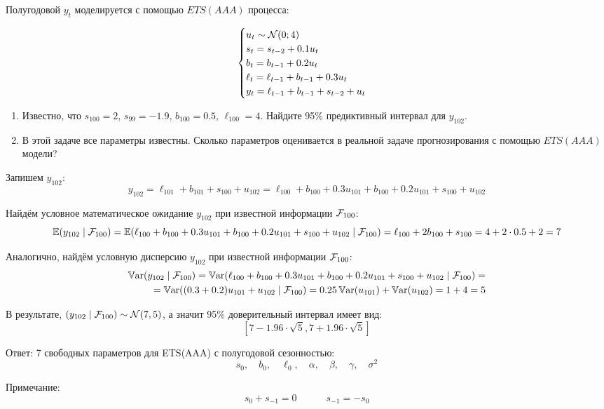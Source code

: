 \begin{problem}
Полугодовой $y_t$ моделируется с помощью $ETS(AAA)$ процесса:
    
\[
\begin{cases}
    u_t \sim \mathcal{N}(0; 4) \\
    s_t = s_{t-2} + 0.1 u_t \\
    b_t = b_{t-1} + 0.2 u_t \\
    \ell_t = \ell_{t-1} + b_{t-1} + 0.3 u_t \\
    y_t = \ell_{t-1} + b_{t-1} + s_{t-2} + u_t \\
\end{cases}    
\]

\begin{enumerate}
    \item Известно, что $s_{100} = 2$, $s_{99} = -1.9$, $b_{100} = 0.5$, $\ell_{100} = 4$. Найдите 95\% предиктивный интервал для $y_{102}$. 
    \item В этой задаче все параметры известны. Сколько параметров оценивается в реальной задаче прогнозирования с помощью $ETS(AAA)$ модели?
\end{enumerate}
\begin{sol}

  Запишем $y_{102}$:
  \[
  y_{102} = \ell_{101} + b_{101} + s_{100} + u_{102} = \ell_{100} + b_{100} + 0.3 u_{101} + b_{100} + 0.2 u_{101} + s_{100} + u_{102}
  \]

  Найдём условное математическое ожидание $y_{102}$ при известной информации $\mathcal{F}_{100}$:
  \[
  \operatorname{\mathbb{E}}(y_{102}\mid \mathcal{F}_{100}) = \operatorname{\mathbb{E}}(\ell_{100} + b_{100} + 0.3 u_{101} + b_{100} + 0.2 u_{101} + s_{100} + u_{102}\mid \mathcal{F}_{100}) = \ell_{100} + 2 b_{100} + s_{100} = 4 + 2 \cdot 0.5 + 2 = 7
  \]

  Аналогично, найдём условную дисперсию $y_{102}$ при известной информации $\mathcal{F}_{100}$:
  \begin{align*}  
  \operatorname{\mathbb{V}\mathrm{ar}}(y_{102}\mid \mathcal{F}_{100}) = \operatorname{\mathbb{V}\mathrm{ar}}(\ell_{100} + b_{100} + 0.3 u_{101} + b_{100} + 0.2 u_{101} + s_{100} + u_{102}\mid \mathcal{F}_{100}) = &\\
  = \operatorname{\mathbb{V}\mathrm{ar}}((0.3+0.2)u_{101} + u_{102}\mid \mathcal{F}_{100}) = 0.25 \operatorname{\mathbb{V}\mathrm{ar}}(u_{101}) + \operatorname{\mathbb{V}\mathrm{ar}}(u_{102}) = 1 + 4 = 5&
\end{align*}
  
  В результате, $(y_{102} \mid \mathcal{F}_{100}) \sim \mathcal{N}(7, 5)$, а значит 95\% доверительный интервал имеет вид:
  \[
  \left[7 - 1.96 \cdot \sqrt{5}, 7 + 1.96 \cdot \sqrt{5} \right]
  \]
  
  Ответ: 7 свободных параметров для ETS(AAA) с полугодовой сезонностью:
  \[
  s_0, \quad b_0,  \quad \ell_0, \quad \alpha, \quad \beta, \quad \gamma, \quad \sigma^2
  \]
  
  Примечание: 
  \[
  s_0 + s_{-1} = 0 \quad \quad \quad  s_{-1} = - s_{0}
  \]

\end{sol}
\end{problem}

